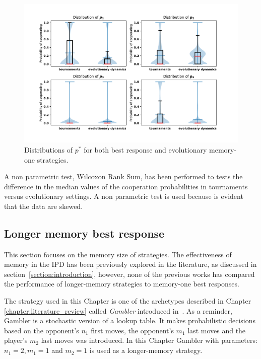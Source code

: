 \begin{figure}[!htbp]
    \centering
    \includegraphics[width=.8\textwidth]{src/chapters/05/paper/Memory-size-in-the-prisoners-dilemma/img/behaviour_violin_plots.pdf}
    \caption{Distributions of \(p^*\) for both best response and evolutionary memory-one
    strategies.}
    \label{fig:behaviour_violin_plots}
\end{figure}

\begin{table}[!htbp]
    \centering
    \resizebox{.7\columnwidth}{!}{%
    }
    \caption{A non parametric test, Wilcoxon Rank Sum, has been performed to
    tests the difference in the median values of the cooperation probabilities
    in tournaments versus evolutionary settings. A non parametric test is used because
    is evident that the data are skewed.}\label{table:wilcoxon_tests}
\end{table}

\subsection{Longer memory best response}\label{subsection:longer_memory_best_response}

This section focuses on the memory size of strategies. The effectiveness of
memory in the IPD has been previously explored in the literature, as
discussed in section~\ref{section:introduction}, however, none of the
previous works has compared the performance of longer-memory strategies to
memory-one best responses.

The strategy used in this Chapter is one of the archetypes described in Chapter
\ref{chapter:literature_review} called \textit{Gambler} introduced
in~\cite{Harper2017}. As a reminder, Gambler is a stochastic version of a lookup
table. It makes probabilistic decisions based on the opponent's \(n_1\) first
moves, the opponent's \(m_1\) last moves and the player's \(m_2\) last moves was
introduced. In this Chapter Gambler with parameters: $n_1 = 2, m_1 = 1$ and $m_2
= 1$ is used as a longer-memory strategy.

